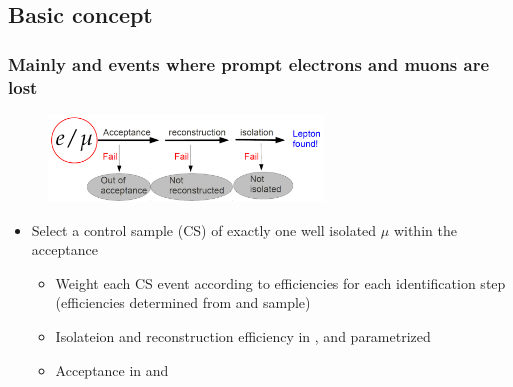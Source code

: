 \documentclass{beamer}
\begin{document}
\subsection{Basic concept}
\begin{frame}
  \frametitle{Mainly \ttbar and \wpj events where prompt electrons and muons are lost}
   \begin{figure}
 \centering
  \includegraphics[width = 0.65\textwidth]{figures/lepton_veto_sketch.png}
 \end{figure}
      \begin{itemize}
      \item Select a control sample (CS) of exactly one well isolated $\mu$ within the acceptance
        \begin{itemize}
        \item Weight each CS event according to efficiencies for each identification step \\ (efficiencies determined from \ttbar and \wpj sample)
        \item Isolateion and reconstruction efficiency in \HT, \MHT and \NJets parametrized
        \item Acceptance in \MHT and \NJets
        \end{itemize}
      \end{itemize}
\end{frame}
\end{document}
